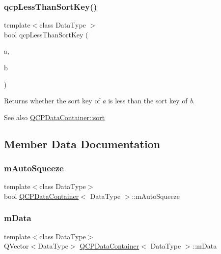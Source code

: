 \subsubsection{\texorpdfstring{qcp\+Less\+Than\+Sort\+Key()}{qcpLessThanSortKey()}}
{\footnotesize\ttfamily template$<$class Data\+Type $>$ \\
bool qcp\+Less\+Than\+Sort\+Key (\begin{DoxyParamCaption}\item[{const Data\+Type \&}]{a,  }\item[{const Data\+Type \&}]{b }\end{DoxyParamCaption})\hspace{0.3cm}{\ttfamily [related]}}

Returns whether the sort key of {\itshape a} is less than the sort key of {\itshape b}.

\begin{DoxySeeAlso}{See also}
\hyperlink{class_q_c_p_data_container_a75da92e33063b63d6da5014683591d45}{Q\+C\+P\+Data\+Container\+::sort} 
\end{DoxySeeAlso}


\subsection{Member Data Documentation}
\mbox{\label{class_q_c_p_data_container_aae64c517d64511ad7a81ff8ee7b29147}} 
\subsubsection{\texorpdfstring{m\+Auto\+Squeeze}{mAutoSqueeze}}
{\footnotesize\ttfamily template$<$class Data\+Type$>$ \\
bool \hyperlink{class_q_c_p_data_container}{Q\+C\+P\+Data\+Container}$<$ Data\+Type $>$\+::m\+Auto\+Squeeze\hspace{0.3cm}{\ttfamily [protected]}}

\mbox{\label{class_q_c_p_data_container_a74906b4da829849c4062b5337c72585d}} 
\subsubsection{\texorpdfstring{m\+Data}{mData}}
{\footnotesize\ttfamily template$<$class Data\+Type$>$ \\
Q\+Vector$<$Data\+Type$>$ \hyperlink{class_q_c_p_data_container}{Q\+C\+P\+Data\+Container}$<$ Data\+Type $>$\+::m\+Data\hspace{0.3cm}{\ttfamily [protected]}}

